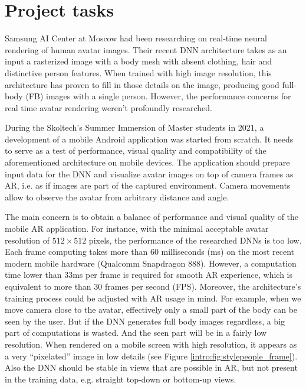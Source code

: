 \section{Project tasks}\label{intro:task}
 
Samsung AI Center at Moscow had been researching on real-time neural rendering of human avatar images. Their recent DNN architecture \cite{dnn:stylepeople21} takes as an input a rasterized image with a body mesh with absent clothing, hair and distinctive person features. When trained with high image resolution, this architecture has proven to fill in those details on the image, producing good full-body (FB) images with a single person. However, the performance concerns for real time avatar rendering weren't profoundly researched.
 

During the Skoltech's Summer Immersion of Master students in 2021, a development of a mobile Android application was started from scratch. It needs to serve as a test of performance, visual quality and compatibility of the aforementioned architecture on mobile devices. The application should prepare input data for the DNN and visualize avatar images on top of camera frames as AR, i.e. as if images are part of the captured environment. Camera movements allow to observe the avatar from arbitrary distance and angle.
 
The main concern is to obtain a balance of performance and visual quality of the mobile AR application. For instance, with the minimal acceptable avatar resolution of $512\times512$ pixels, the performance of the researched DNNs is too low. Each frame computing takes more than 60 milliseconds (ms) on the most recent modern mobile hardware (Qualcomm Snapdragon 888). However, a computation time lower than 33ms per frame is required for smooth AR experience, which is equivalent to more than 30 frames per second (FPS). Moreover, the architecture's training process could be adjusted with AR usage in mind. For example, when we move camera close to the avatar, effectively only a small part of the body can be seen by the user. But if the DNN generates full body images regardless, a big part of computations is wasted. And the seen part will be in a fairly low resolution. When rendered on a mobile screen with high resolution, it appears as a very ``pixelated'' image in low details (see Figure \ref{intro:fig:stylepeople_frame}\protect{}). Also the DNN should be stable in views that are possible in AR, but not present in the training data, e.g. straight top-down or bottom-up views. 

